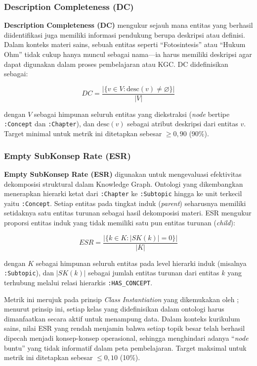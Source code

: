 \documentclass[main]{subfiles}
\begin{document}
\subsubsection{Description Completeness (DC)}

\textbf{Description Completeness (DC)} mengukur sejauh mana entitas yang
berhasil diidentifikasi juga memiliki informasi pendukung berupa
deskripsi atau definisi. Dalam konteks materi sains, sebuah entitas
seperti ``Fotosintesis'' atau ``Hukum Ohm'' tidak cukup hanya muncul
sebagai nama---ia harus memiliki deskripsi agar dapat digunakan dalam
proses pembelajaran atau KGC. DC didefinisikan sebagai:

\[
  DC = \frac{\bigl|\{ v \in V : \text{desc}(v) \neq \varnothing \}\bigr|}{|V|}
\]

\noindent dengan $V$ sebagai himpunan seluruh entitas yang diekstraksi
(\textit{node} bertipe \texttt{:Concept} dan \texttt{:Chapter}), dan $\text{desc}(v)$
sebagai atribut deskripsi dari entitas $v$. Target minimal untuk metrik
ini ditetapkan sebesar $\geq 0{,}90$ (90\%).

\subsubsection{Empty SubKonsep Rate (ESR)}

\textbf{Empty SubKonsep Rate (ESR)} digunakan untuk mengevaluasi
efektivitas dekomposisi struktural dalam Knowledge Graph. Ontologi yang
dikembangkan menerapkan hierarki ketat dari \texttt{:Chapter} ke
\texttt{:Subtopic} hingga ke unit terkecil yaitu \texttt{:Concept}.
Setiap entitas pada tingkat induk (\textit{parent}) seharusnya memiliki
setidaknya satu entitas turunan sebagai hasil dekomposisi materi. ESR
mengukur proporsi entitas induk yang tidak memiliki satu pun entitas
turunan (\textit{child}):

\[
  ESR = \frac{\bigl|\{ k \in K : |SK(k)| = 0 \}\bigr|}{|K|}
\]

\noindent dengan $K$ sebagai himpunan seluruh entitas pada level hierarki
induk (misalnya \texttt{:Subtopic}), dan $|SK(k)|$ sebagai jumlah entitas
turunan dari entitas $k$ yang terhubung melalui relasi hierarkis
\texttt{:HAS\_CONCEPT}.

Metrik ini merujuk pada prinsip \textit{Class Instantiation} yang
dikemukakan oleh \textcite{seo_structural_2022}; menurut prinsip ini, setiap kelas yang
didefinisikan dalam ontologi harus dimanfaatkan secara aktif untuk
menampung data. Dalam konteks kurikulum sains, nilai ESR yang rendah
menjamin bahwa setiap topik besar telah berhasil dipecah menjadi
konsep-konsep operasional, sehingga menghindari adanya ``\textit{node} buntu''
yang tidak informatif dalam peta pembelajaran. Target maksimal untuk
metrik ini ditetapkan sebesar $\leq 0{,}10$ (10\%).
\end{document}
